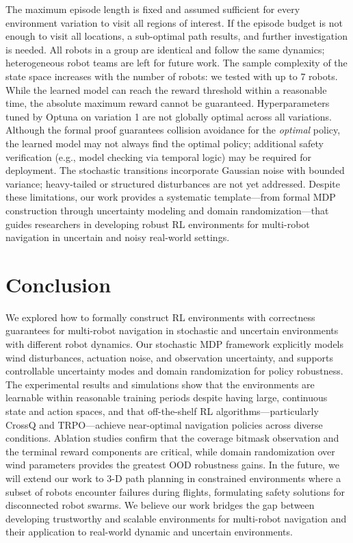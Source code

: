 \documentclass{article}
\begin{document}
The maximum episode length is fixed and assumed sufficient for every environment variation to visit all regions of interest. If the episode budget is not enough to visit all locations, a sub-optimal path results, and further investigation is needed. All robots in a group are identical and follow the same dynamics; heterogeneous robot teams are left for future work. The sample complexity of the state space increases with the number of robots: we tested with up to 7 robots. While the learned model can reach the reward threshold within a reasonable time, the absolute maximum reward cannot be guaranteed. Hyperparameters tuned by Optuna on variation 1 are not globally optimal across all variations. Although the formal proof guarantees collision avoidance for the \emph{optimal} policy, the learned model may not always find the optimal policy; additional safety verification (e.g., model checking via temporal logic) may be required for deployment. The stochastic transitions incorporate Gaussian noise with bounded variance; heavy-tailed or structured disturbances are not yet addressed. Despite these limitations, our work provides a systematic template—from formal MDP construction through uncertainty modeling and domain randomization—that guides researchers in developing robust RL environments for multi-robot navigation in uncertain and noisy real-world settings.

\section{Conclusion}
\label{sec:conclusion}

We explored how to formally construct RL environments with correctness guarantees for multi-robot navigation in stochastic and uncertain environments with different robot dynamics. Our stochastic MDP framework explicitly models wind disturbances, actuation noise, and observation uncertainty, and supports controllable uncertainty modes and domain randomization for policy robustness. The experimental results and simulations show that the environments are learnable within reasonable training periods despite having large, continuous state and action spaces, and that off-the-shelf RL algorithms—particularly CrossQ and TRPO—achieve near-optimal navigation policies across diverse conditions. Ablation studies confirm that the coverage bitmask observation and the terminal reward components are critical, while domain randomization over wind parameters provides the greatest OOD robustness gains. In the future, we will extend our work to 3-D path planning in constrained environments where a subset of robots encounter failures during flights, formulating safety solutions for disconnected robot swarms. We believe our work bridges the gap between developing trustworthy and scalable environments for multi-robot navigation and their application to real-world dynamic and uncertain environments.
\end{document}
